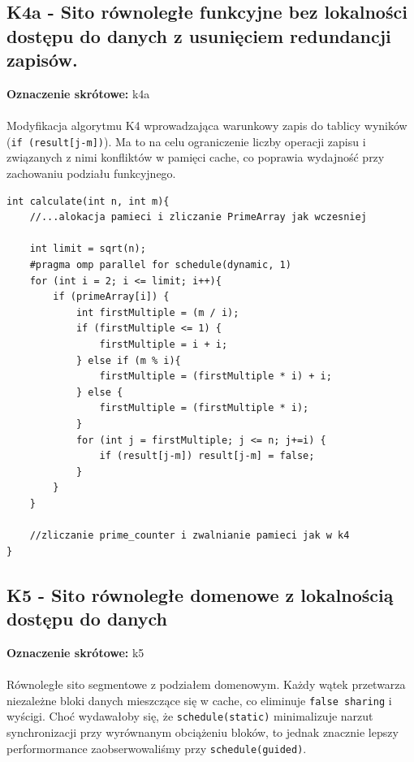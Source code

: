 \documentclass[10pt]{article}
\begin{document}
\newpage
\subsection*{K4a - Sito równoległe funkcyjne bez lokalności dostępu do danych z usunięciem redundancji zapisów.}
\textbf{Oznaczenie skrótowe:} k4a
\\ \\ 
Modyfikacja algorytmu K4 wprowadzająca warunkowy zapis do tablicy wyników (\texttt{if (result[j-m])}). Ma to na celu ograniczenie liczby operacji zapisu i związanych 
z nimi konfliktów w pamięci cache, co poprawia wydajność przy zachowaniu podziału funkcyjnego.
\\

\begin{lstlisting}[style=mystyle, caption={Kod programu k4a.cpp}, label={lst:k4a}]
int calculate(int n, int m){
	//...alokacja pamieci i zliczanie PrimeArray jak wczesniej

	int limit = sqrt(n);
	#pragma omp parallel for schedule(dynamic, 1)
	for (int i = 2; i <= limit; i++){
		if (primeArray[i]) {
			int firstMultiple = (m / i);
			if (firstMultiple <= 1) {
				firstMultiple = i + i;
			} else if (m % i){ 
				firstMultiple = (firstMultiple * i) + i;
			} else {
				firstMultiple = (firstMultiple * i);
			}
			for (int j = firstMultiple; j <= n; j+=i) {
				if (result[j-m]) result[j-m] = false;
			} 
		}
	}

	//zliczanie prime_counter i zwalnianie pamieci jak w k4
}
\end{lstlisting}


\newpage
\subsection*{K5 - Sito równoległe domenowe z lokalnością dostępu do danych}
\textbf{Oznaczenie skrótowe:} k5
\\ \\
Równoległe sito segmentowe z podziałem domenowym. Każdy wątek przetwarza niezależne bloki danych mieszczące się w cache, co eliminuje \texttt{false sharing} i wyścigi. 
Choć wydawałoby się, że \texttt{schedule(static)} minimalizuje narzut synchronizacji przy wyrównanym obciążeniu bloków,
to jednak znacznie lepszy performormance zaobserwowaliśmy przy \texttt{schedule(guided)}.
\\
\end{document}
